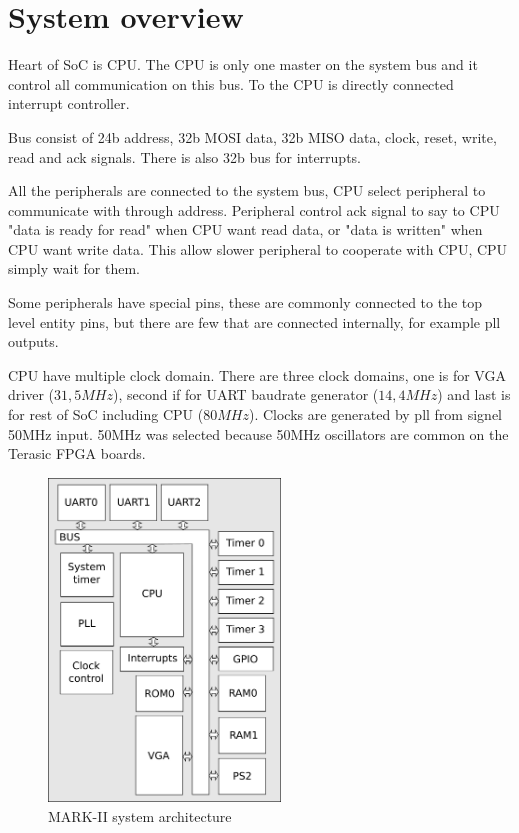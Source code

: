 \section{System overview}

Heart of SoC is CPU. The CPU is only one master on the system bus and it control
all communication on this bus. To the CPU is directly connected interrupt
controller.

Bus consist of 24b address, 32b MOSI data, 32b MISO data, clock, reset, write,
read and ack signals. There is also 32b bus for interrupts.

All the peripherals are connected to the system bus, CPU select peripheral to
communicate with through address. Peripheral control ack signal to say to CPU
"data is ready for read" when CPU want read data, or "data is written" when CPU
want write data. This allow slower peripheral to cooperate with CPU, CPU simply
wait for them.

Some peripherals have special pins, these are commonly connected to the top
level entity pins, but there are few that are connected internally, for example
pll outputs.

CPU have multiple clock domain. There are three clock domains, one is for VGA
driver ($31,5 MHz$), second if for UART baudrate generator ($14,4 MHz$) and
last is for rest of SoC including CPU ($80 MHz$). Clocks are generated by pll
from signel 50MHz input. 50MHz was selected because 50MHz oscillators are
common on the Terasic FPGA boards.

\begin{figure}
    \centering
    \includegraphics[width=0.55\textwidth]{img/MARK_II.png}
    \caption{MARK-II system architecture}
    \label{fig:sysarch}
\end{figure}


